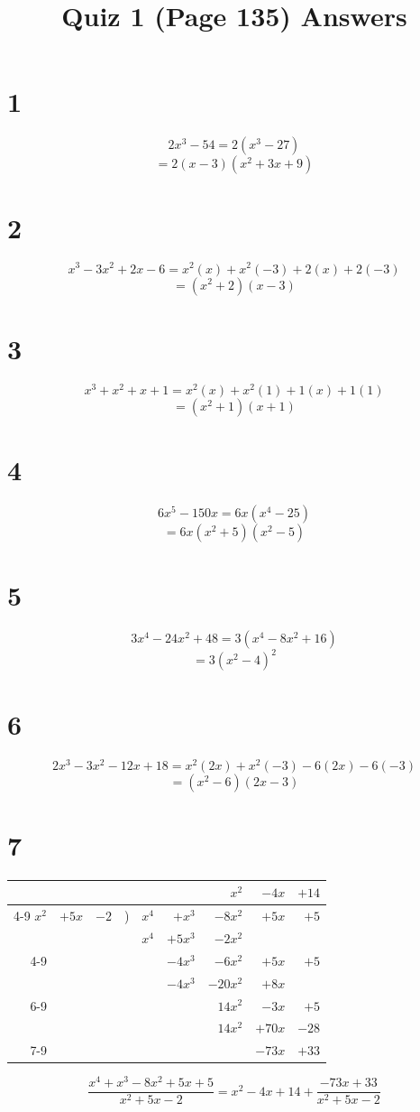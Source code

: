 \documentclass{article}
\title{Quiz 1 (Page 135) Answers}
\theoremstyle{definition}
\begin{document}
\maketitle

\section*{1}
\[ 2x^3-54=2(x^3-27) \]
\[ =2(x-3)(x^2+3x+9) \]

\section*{2}
\[ x^3-3x^2+2x-6=x^2(x)+x^2(-3)+2(x)+2(-3) \]
\[ =(x^2+2)(x-3) \]

\section*{3}
\[ x^3+x^2+x+1=x^2(x)+x^2(1)+1(x)+1(1) \]
\[ =(x^2+1)(x+1) \]

\section*{4}
\[ 6x^5-150x=6x(x^4-25) \]
\[ =6x(x^2+5)(x^2-5) \]

\section*{5}
\[ 3x^4-24x^2+48=3(x^4-8x^2+16) \]
\[ =3(x^2-4)^2 \]

\section*{6}
\[ 2x^3-3x^2-12x+18=x^2(2x)+x^2(-3)-6(2x)-6(-3) \]
\[ =(x^2-6)(2x-3) \]

\section*{7}
\begin{center}
	\begin{tabular}{rrrrrrrrr}
		      &       &      &   &       &         & $x^2$    & $-4x$  & $+14$  \\
		                     \cmidrule{4-9}
		$x^2$ & $+5x$ & $-2$ & ) & $x^4$ & $+x^3$  & $-8x^2$    & $+5x$  & $+5$   \\
		      &       &      &   & $x^4$ & $+5x^3$ & $-2x^2$                   \\
			             \cmidrule{4-9}
		      &       &      &   &       & $-4x^3$ & $-6x^2$  & $+5x$  & $+5$   \\
		      &       &      &   &       & $-4x^3$ & $-20x^2$ & $+8x$          \\
						\cmidrule{6-9}
		      &       &      &   &       &         & $14x^2$  & $-3x$  & $+5$  \\
		      &       &      &   &       &         & $14x^2$  & $+70x$ & $-28$ \\
							   \cmidrule{7-9}
		      &       &      &   &       &         &          & $-73x$ & $+33$
	\end{tabular}
\end{center}
\[ \dfrac{x^4+x^3-8x^2+5x+5}{x^2+5x-2}=x^2-4x+14+\dfrac{-73x+33}{x^2+5x-2} \]
\end{document}
